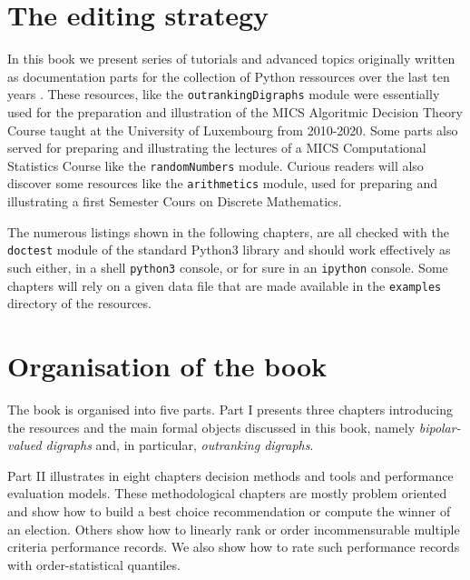 \label{sec:0}



\section{The editing strategy}

In this book we present series of tutorials and advanced topics originally written as documentation parts for the \Digraph collection of Python ressources over the last ten years \citep{BIS-2021}. These \Digraph resources, like the \texttt{outrankingDigraphs} module were essentially used for the preparation and illustration of the MICS Algoritmic Decision Theory Course taught at the University of Luxembourg from 2010-2020. Some parts also served for preparing and illustrating the lectures of a MICS Computational Statistics Course like the \texttt{randomNumbers} module. Curious readers will also discover some resources like the \texttt{arithmetics} module, used for preparing and illustrating a first Semester Cours on Discrete Mathematics.

The numerous listings shown in the following chapters, are all checked with the \texttt{doctest} module of the standard Python3 library and should work effectively as such either, in a shell \texttt{python3} console, or for sure in an \texttt{ipython} console. Some chapters will rely on a given data file that are made available in the \texttt{examples} directory of the \Digraph resources. 

\section{Organisation of the book}

\noindent The book is organised into five parts. Part I presents three chapters introducing the \Digraph resources and the main formal objects discussed in this book, namely \emph{bipolar-valued digraphs} and, in particular, \emph{outranking digraphs}.

Part II illustrates in eight chapters decision methods and tools and performance evaluation models. These methodological chapters are mostly problem oriented and show how to build a best choice recommendation or compute the winner of an election. Others show how to linearly rank or order incommensurable multiple criteria performance records. We also show how to rate such performance records with order-statistical quantiles.

